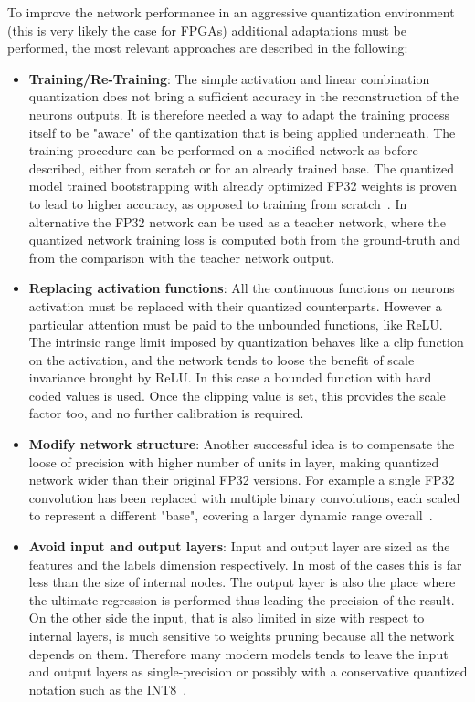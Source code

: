 To improve the network performance in an aggressive quantization environment (this is very likely the case for FPGAs) additional adaptations must be performed, the most relevant approaches are described in the following:
\begin{itemize}
    \item \textbf{Training/Re-Training}: The simple activation and linear combination quantization does not bring a sufficient accuracy in the reconstruction of the neurons outputs. It is therefore needed a way to adapt the training process itself to be "aware" of the qantization that is being applied underneath. 
    The training procedure can be performed on a modified network as before described, either from scratch or for an already trained base. The quantized model trained bootstrapping with already optimized FP32 weights is proven to lead to higher accuracy, as opposed to training from scratch~\cite{zhou2017}. 
    In alternative the FP32 network can be used as a teacher network, where the quantized network training loss is computed both from the ground-truth and from the comparison with the teacher network output.
    
    \item \textbf{Replacing activation functions}: All the continuous functions on neurons activation must be replaced with their quantized counterparts. However a particular attention must be paid to the unbounded functions, like ReLU. The intrinsic range limit imposed by quantization behaves like a clip function on the activation, and the network tends to loose the benefit of scale invariance brought by ReLU. In this case a bounded function with hard coded values is used. Once the clipping value is set, this provides the scale factor too, and no further calibration is required.
    
    \item \textbf{Modify network structure}: Another successful idea is to compensate the loose of precision with higher number of units in layer, making quantized network wider than their original FP32 versions. For example a single FP32 convolution has been replaced with multiple binary convolutions, each scaled to represent a different "base", covering a larger dynamic range overall~\cite{NIPS2017_6638}. 
    
    \item \textbf{Avoid input and output layers}: Input and output layer are sized as the features and the labels dimension respectively. In most of the cases this is far less than the size of internal nodes. The output layer is also the place where the ultimate regression is performed thus leading the precision of the result. On the other side the input, that is also limited in size with respect to internal layers, is much sensitive to weights pruning because all the network depends on them. 
    Therefore many modern models tends to leave the input and output layers as single-precision or possibly with a conservative quantized notation such as the INT8~\cite{choi2018pact}.
\end{itemize}



